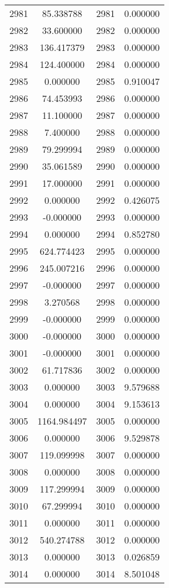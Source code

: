 \documentclass[12pt]{article}
\begin{document}
\begin{longtable}{@{}cccc@{}}
2981 & 85.338788 & 2981 & 0.000000 \\
2982 & 33.600000 & 2982 & 0.000000 \\
2983 & 136.417379 & 2983 & 0.000000 \\
2984 & 124.400000 & 2984 & 0.000000 \\
2985 & 0.000000 & 2985 & 0.910047 \\
2986 & 74.453993 & 2986 & 0.000000 \\
2987 & 11.100000 & 2987 & 0.000000 \\
2988 & 7.400000 & 2988 & 0.000000 \\
2989 & 79.299994 & 2989 & 0.000000 \\
2990 & 35.061589 & 2990 & 0.000000 \\
2991 & 17.000000 & 2991 & 0.000000 \\
2992 & 0.000000 & 2992 & 0.426075 \\
2993 & -0.000000 & 2993 & 0.000000 \\
2994 & 0.000000 & 2994 & 0.852780 \\
2995 & 624.774423 & 2995 & 0.000000 \\
2996 & 245.007216 & 2996 & 0.000000 \\
2997 & -0.000000 & 2997 & 0.000000 \\
2998 & 3.270568 & 2998 & 0.000000 \\
2999 & -0.000000 & 2999 & 0.000000 \\
3000 & -0.000000 & 3000 & 0.000000 \\
3001 & -0.000000 & 3001 & 0.000000 \\
3002 & 61.717836 & 3002 & 0.000000 \\
3003 & 0.000000 & 3003 & 9.579688 \\
3004 & 0.000000 & 3004 & 9.153613 \\
3005 & 1164.984497 & 3005 & 0.000000 \\
3006 & 0.000000 & 3006 & 9.529878 \\
3007 & 119.099998 & 3007 & 0.000000 \\
3008 & 0.000000 & 3008 & 0.000000 \\
3009 & 117.299994 & 3009 & 0.000000 \\
3010 & 67.299994 & 3010 & 0.000000 \\
3011 & 0.000000 & 3011 & 0.000000 \\
3012 & 540.274788 & 3012 & 0.000000 \\
3013 & 0.000000 & 3013 & 0.026859 \\
3014 & 0.000000 & 3014 & 8.501048 \\

\end{longtable}
\end{document}
